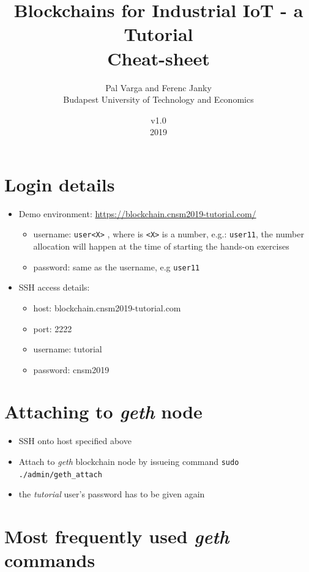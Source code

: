 \documentclass[a4paper]{article}
\title{Blockchains for Industrial IoT - a Tutorial \\ \large Cheat-sheet }
\author{Pal Varga and Ferenc Janky \\ Budapest University of Technology and Economics}
\date{v1.0 \\ 2019}
\begin{document}
\maketitle

\section{Login details}

\begin{itemize}
\item Demo environment: \url{https://blockchain.cnsm2019-tutorial.com/}
\begin{itemize}
\item username: \verb!user<X>! , where is \verb!<X>! is a number,  e.g.: \verb!user11!, the number allocation will happen at the time of starting the hands-on exercises
\item password: same as the username, e.g \verb!user11!
\end{itemize}
\item SSH access details:
\begin{itemize} 
\item host: blockchain.cnsm2019-tutorial.com
\item port: 2222
\item username: tutorial
\item password: cnsm2019
\end{itemize}
\end{itemize}

\section{Attaching to \emph{geth} node}

\begin{itemize}
\item SSH onto host specified above
\item Attach to \emph{geth} blockchain node by issueing command \verb!sudo ./admin/geth_attach!
\item the \emph{tutorial} user's password has to be given again
\end{itemize}

\section{Most frequently used \emph{geth} commands}
\end{document}
